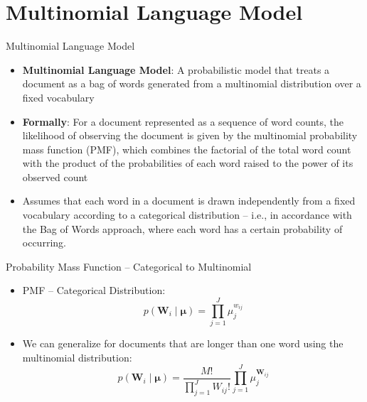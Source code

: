 \documentclass[
  ignorenonframetext,
  aspectratio=169]{beamer}
\begin{document}
\section{Multinomial Language Model}\label{multinomial-language-model}

\begin{frame}{Multinomial Language Model}
\label{multinomial-language-model-1}
\begin{itemize}
\item \textbf{Multinomial Language Model}: A probabilistic model that treats a document as a bag of words generated from a multinomial distribution over a fixed vocabulary \par \vspace{2.5mm}
\item \textbf{Formally}: For a document represented as a sequence of word counts, the likelihood of observing the document is given by the multinomial probability mass function (PMF), which combines the factorial of the total word count with the product of the probabilities of each word raised to the power of its observed count
\item Assumes that each word in a document is drawn independently from a fixed vocabulary according to a categorical distribution – i.e., in accordance with the Bag of Words approach, where each word has a certain probability of occurring.  \par \vspace{2.5mm}
\end{itemize}
\end{frame}

\begin{frame}{Probability Mass Function -- Categorical to Multinomial}
\label{probability-mass-function-categorical-to-multinomial}
\begin{itemize}
\item[] PMF -- Categorical Distribution: 
$$
p(\mathbf{W}_i \mid \boldsymbol{\mu})
= \prod_{j=1}^J \mu_j^{w_{ij}}
$$

\item[] We can generalize for documents that are longer than one word using the multinomial distribution:
$$
p(\mathbf{W}_i \mid \boldsymbol{\mu}) = 
\frac{M!}{\prod_{j=1}^J W_{ij}!} \prod_{j=1}^J
\mu_{j}^{\mathbf{W}_{ij}}
$$
\end{itemize}
\end{frame}
\end{document}
